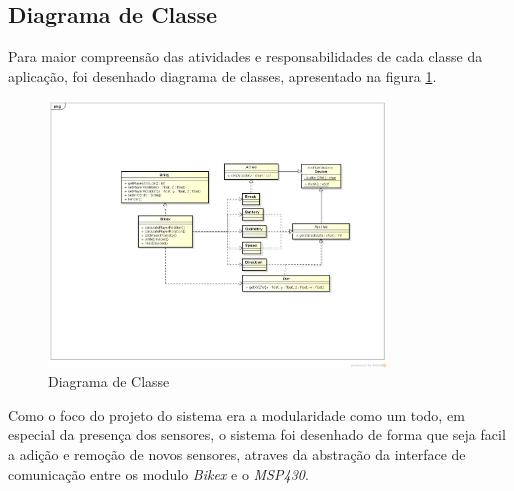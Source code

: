 
\subsection{Diagrama de Classe} %
\label{sec:diagrama_de_classe}

Para maior compreensão das atividades e responsabilidades de cada classe da aplicação, foi desenhado %
diagrama de classes, apresentado na figura \ref{fig:diagrama-classe}.

\begin{figure}[h]
  \centering
	\includegraphics[width=0.8\textwidth]{figuras/class_diagram}
  \caption{Diagrama de Classe}
  \label{fig:diagrama-classe}
\end{figure}

Como o foco do projeto do sistema era a modularidade como um todo, em especial da presença dos sensores, o sistema foi desenhado de forma que seja facil a adição e remoção de novos sensores, atraves da abstração da interface de comunicação entre os modulo \textit{Bikex} e o \textit{MSP430}.

